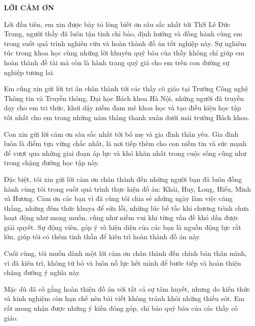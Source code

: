 \documentclass[../DoAn.tex]{subfiles}
\begin{document}
\begin{center}
    \Large{\textbf{LỜI CẢM ƠN}}\\
\end{center}
\vspace{1cm}
\hspace*{13pt} Lời đầu tiên, em xin được bày tỏ lòng biết ơn sâu sắc nhất tới ThS Lê Đức Trung, người thầy đã luôn tận tình chỉ bảo, định hướng và đồng hành cùng em trong suốt quá trình nghiên cứu và hoàn thành đồ án tốt nghiệp này. Sự nghiêm túc trong khoa học cùng những lời khuyên quý báu của thầy không chỉ giúp em hoàn thành đề tài mà còn là hành trang quý giá cho em trên con đường sự nghiệp tương lai.

Em cũng xin gửi lời tri ân chân thành tới các thầy cô giáo tại Trường Công nghệ Thông tin và Truyền thông, Đại học Bách khoa Hà Nội, những người đã truyền dạy cho em tri thức, khơi dậy niềm đam mê khoa học và tạo điều kiện học tập tốt nhất cho em trong những năm tháng thanh xuân dưới mái trường Bách khoa.

Con xin gửi lời cảm ơn sâu sắc nhất tới bố mẹ và gia đình thân yêu. Gia đình luôn là điểm tựa vững chắc nhất, là nơi tiếp thêm cho con niềm tin và sức mạnh để vượt qua những giai đoạn áp lực và khó khăn nhất trong cuộc sống cũng như trong chặng đường học tập này.

Đặc biệt, tôi xin gửi lời cảm ơn chân thành đến những người bạn đã luôn đồng hành cùng tôi trong suốt quá trình thực hiện đồ án: Khải, Huy, Long, Hiểu, Minh và Hương. Cảm ơn các bạn vì đã cùng tôi chia sẻ những ngày làm việc căng thẳng, những đêm thức khuya để sửa lỗi, những lúc bế tắc khi chương trình chưa hoạt động như mong muốn, cũng như niềm vui khi từng vấn đề khó dần được giải quyết. Sự động viên, góp ý và hiện diện của các bạn là nguồn động lực rất lớn, giúp tôi có thêm tinh thần để kiên trì hoàn thành đồ án này.

Cuối cùng, tôi muốn dành một lời cảm ơn chân thành đến chính bản thân mình, vì đã kiên trì, không từ bỏ và luôn nỗ lực hết mình để bước tiếp và hoàn thiện chặng đường ý nghĩa này.

Mặc dù đã cố gắng hoàn thiện đồ án với tất cả sự tâm huyết, nhưng do kiến thức và kinh nghiệm còn hạn chế nên bài viết không tránh khỏi những thiếu sót. Em rất mong nhận được những ý kiến đóng góp, chỉ bảo quý báu của các thầy cô giáo.
\end{document}
